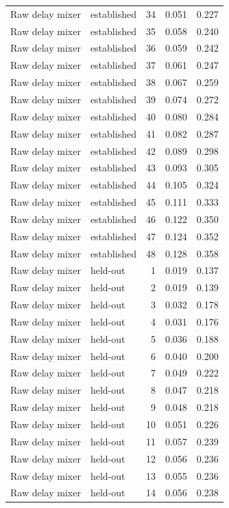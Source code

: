 \begin{tabular}{llrrr}
Raw delay mixer & established & 34 & 0.051 & 0.227 \\
Raw delay mixer & established & 35 & 0.058 & 0.240 \\
Raw delay mixer & established & 36 & 0.059 & 0.242 \\
Raw delay mixer & established & 37 & 0.061 & 0.247 \\
Raw delay mixer & established & 38 & 0.067 & 0.259 \\
Raw delay mixer & established & 39 & 0.074 & 0.272 \\
Raw delay mixer & established & 40 & 0.080 & 0.284 \\
Raw delay mixer & established & 41 & 0.082 & 0.287 \\
Raw delay mixer & established & 42 & 0.089 & 0.298 \\
Raw delay mixer & established & 43 & 0.093 & 0.305 \\
Raw delay mixer & established & 44 & 0.105 & 0.324 \\
Raw delay mixer & established & 45 & 0.111 & 0.333 \\
Raw delay mixer & established & 46 & 0.122 & 0.350 \\
Raw delay mixer & established & 47 & 0.124 & 0.352 \\
Raw delay mixer & established & 48 & 0.128 & 0.358 \\
Raw delay mixer & held-out & 1 & 0.019 & 0.137 \\
Raw delay mixer & held-out & 2 & 0.019 & 0.139 \\
Raw delay mixer & held-out & 3 & 0.032 & 0.178 \\
Raw delay mixer & held-out & 4 & 0.031 & 0.176 \\
Raw delay mixer & held-out & 5 & 0.036 & 0.188 \\
Raw delay mixer & held-out & 6 & 0.040 & 0.200 \\
Raw delay mixer & held-out & 7 & 0.049 & 0.222 \\
Raw delay mixer & held-out & 8 & 0.047 & 0.218 \\
Raw delay mixer & held-out & 9 & 0.048 & 0.218 \\
Raw delay mixer & held-out & 10 & 0.051 & 0.226 \\
Raw delay mixer & held-out & 11 & 0.057 & 0.239 \\
Raw delay mixer & held-out & 12 & 0.056 & 0.236 \\
Raw delay mixer & held-out & 13 & 0.055 & 0.236 \\
Raw delay mixer & held-out & 14 & 0.056 & 0.238 \\

\end{tabular}
